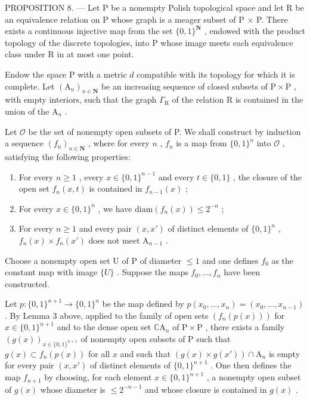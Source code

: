 PROPOSITION 8. --- Let P be a nonempty Polish topological space and let R be an equivalence relation on P whose graph is a meager subset of P × P. There exists a continuous injective map from the set \(\{0,1\}^{\mathbf{N}}\) , endowed with the product topology of the discrete topologies, into P whose image meets each equivalence class under R in at most one point.

Endow the space P with a metric \(d\) compatible with its topology for which it is complete. Let \((\mathrm{A}_n)_{n\in \mathbf{N}}\) be an increasing sequence of closed subsets of \(\mathrm{P}\times \mathrm{P}\) , with empty interiors, such that the graph \(\Gamma_{\mathrm{R}}\) of the relation R is contained in the union of the \(\mathrm{A}_n\) .

Let \(\mathcal{O}\) be the set of nonempty open subsets of P. We shall construct by induction a sequence \((f_n)_{n \in \mathbf{N}}\) , where for every \(n\) , \(f_n\) is a map from \(\{0,1\}^n\) into \(\mathcal{O}\) , satisfying the following properties:

\begin{enumerate}
\def\labelenumi{(\roman{enumi})}
\item
  For every \(n \geqslant 1\) , every \(x \in \{0,1\}^{n-1}\) and every \(t \in \{0,1\}\) , the closure of the open set \(f_n(x,t)\) is contained in \(f_{n-1}(x)\) ;
\item
  For every \(x \in \{0,1\}^n\) , we have \(\mathrm{diam}(f_n(x)) \leqslant 2^{-n}\) ;
\item
  For every \(n \geqslant 1\) and every pair \((x, x')\) of distinct elements of \(\{0, 1\}^n\) , \(f_n(x) \times f_n(x')\) does not meet \(\mathrm{A}_{n-1}\) .
\end{enumerate}

Choose a nonempty open set U of P of diameter \(\leqslant 1\) and one defines \(f_{0}\) as the constant map with image \(\{U\}\) . Suppose the maps \(f_{0}, \ldots, f_{n}\) have been constructed.

Let \(p \colon \{0,1\}^{n+1} \to \{0,1\}^n\) be the map defined by \(p(x_0, \ldots, x_n) = (x_0, \ldots, x_{n-1})\) . By Lemma 3 above, applied to the family of open sets \((f_n(p(x)))\) for \(x \in \{0,1\}^{n+1}\) and to the dense open set \(\mathbb{C}\mathrm{A}_n\) of \(\mathrm{P} \times \mathrm{P}\) , there exists a family \((g(x))_{x \in \{0,1\}^{n+1}}\) of nonempty open subsets of P such that \(g(x) \subset f_n(p(x))\) for all \(x\) and such that \((g(x) \times g(x')) \cap \mathrm{A}_n\) is empty for every pair \((x,x')\) of distinct elements of \(\{0,1\}^{n+1}\) . One then defines the map \(f_{n+1}\) by choosing, for each element \(x \in \{0,1\}^{n+1}\) , a nonempty open subset of \(g(x)\) whose diameter is \(\leqslant 2^{-n-1}\) and whose closure is contained in \(g(x)\) .

